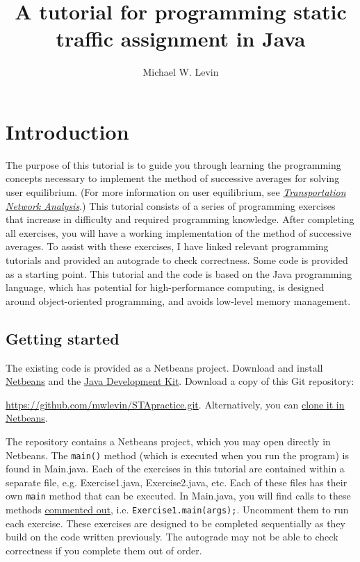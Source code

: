 \documentclass[12pt]{article}
\begin{document}
	\allowdisplaybreaks[1]
	
	
	\title{A tutorial for programming static traffic assignment in Java}
	
	\author{Michael W. Levin}
	
	\maketitle
	
\section{Introduction}

The purpose of this tutorial is to guide you through learning the programming concepts necessary to implement the method of successive averages for solving user equilibrium. (For more information on user equilibrium, see \href{https://sboyles.github.io/blubook.html}{\textit{Transportation Network Analysis}}.)
This tutorial consists of a series of programming exercises that increase in difficulty and required programming knowledge. After completing all exercises, you will have a working implementation of the method of successive averages. 
To assist with these exercises, I have linked relevant programming tutorials and provided an autograde to check correctness. Some code is provided as a starting point. 
This tutorial and the code is based on the Java programming language, which has potential for high-performance computing, is designed around object-oriented programming, and avoids low-level memory management.
%


\subsection{Getting started}
\label{sec11}

The existing code is provided as a Netbeans project. Download and install \href{https://netbeans.apache.org/download/index.html}{Netbeans} and the \href{https://openjdk.java.net/projects/jdk/12/}{Java Development Kit}. Download a copy of this Git repository:

\noindent \href{https://github.com/mwlevin/STApractice.git}{https://github.com/mwlevin/STApractice.git}. Alternatively, you can \href{https://netbeans.org/kb/docs/ide/git.html#clone}{clone it in Netbeans}.


The repository contains a Netbeans project, which you may open directly in Netbeans. The \texttt{main()} method (which is executed when you run the program) is found in Main.java. Each of the exercises in this tutorial are contained within a separate file, e.g. Exercise1.java, Exercise2.java, etc. Each of these files has their own \texttt{main} method that can be executed. 
In Main.java, you will find calls to these methods \href{https://www.w3schools.com/java/java_comments.asp}{commented out}, i.e. \texttt{Exercise1.main(args);}. Uncomment them to run each exercise. 
These exercises are designed to be completed sequentially as they build on the code written previously. The autograde may not be able to check correctness if you complete them out of order. 
\end{document}
